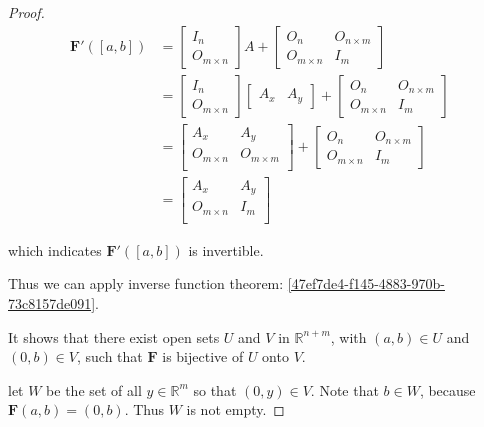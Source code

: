 \begin{proof}
    \begin{align*}
        \mathbf{F}'([a,b]) &= \begin{bmatrix}
           I_n \\ 
           O_{m \times n}
        \end{bmatrix} A + \begin{bmatrix}
           O_n & O_{n \times m} \\
           O_{m \times n} & I_m
        \end{bmatrix}  \\
        &= \begin{bmatrix}
           I_n \\ 
           O_{m \times n}
        \end{bmatrix} \begin{bmatrix}
            A_x & A_y
        \end{bmatrix} + \begin{bmatrix}
           O_n & O_{n \times m} \\
           O_{m \times n} & I_m
        \end{bmatrix} \\
        & =  \begin{bmatrix}
            A_x & A_y \\
            O_{m \times n} & O_{m \times m} \\
        \end{bmatrix} + \begin{bmatrix}
           O_n & O_{n \times m} \\
           O_{m \times n} & I_m
        \end{bmatrix} \\
        &= \begin{bmatrix}
            A_x & A_y \\
            O_{m \times n} & I_m \\
        \end{bmatrix}
    \end{align*}

    which indicates $\mathbf{F}'([a,b])$ is invertible.

    Thus we can apply inverse function theorem: \autoref{47ef7de4-f145-4883-970b-73c8157de091}.

    It shows that there exist open sets $U$ and $V$ in $\mathbb{R}^{n+m}$, with $(a,b) \in U$ and $(0,b) \in V$,
    such that $\mathbf{F}$ is bijective of $U$ onto $V$.

    let $W$ be the set of all $y \in \mathbb{R}^m$ so that $(0,y) \in V$. Note that $b \in W$, because
    $\mathbf{F}(a,b) = (0,b)$. Thus $W$ is not empty. 
    

\end{proof}
